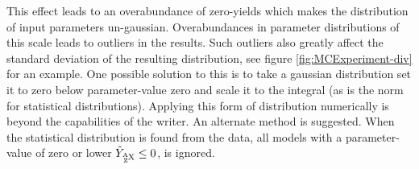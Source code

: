 This effect leads to an overabundance of zero-yields which makes the distribution of input parameters un-gaussian.
Overabundances in parameter distributions of this scale leads to outliers in the results. Such outliers also greatly affect the standard deviation of the resulting distribution, see figure \ref{fig:MCExperiment-div} for an example.
One possible solution to this is to take a gaussian distribution set it to zero below parameter-value zero and scale it to the integral (as is the norm for statistical distributions).
Applying this form of distribution numerically is beyond the capabilities of the writer. An alternate method is suggested. When the statistical distribution is found from the data, all models with a parameter-value of zero or lower $\hat{Y}_{\isotope{X}{Z}{A}} \leq 0 $, is ignored. 

